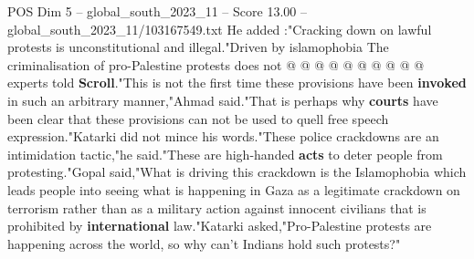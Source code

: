 \begin{textsample}{POS Dim 5 – global\_south\_2023\_11 – Score 13.00 – global\_south\_2023\_11/103167549.txt}
He added :"Cracking down on lawful protests is unconstitutional and illegal."Driven by islamophobia The criminalisation of pro-Palestine protests does not @ @ @ @ @ @ @ @ @ @ experts told \textbf{Scroll}."This is not the first time these provisions have been \textbf{invoked} in such an arbitrary manner,"Ahmad said."That is perhaps why \textbf{courts} have been clear that these provisions can not be used to quell free speech expression."Katarki did not mince his words."These police crackdowns are an intimidation tactic,"he said."These are high-handed \textbf{acts} to deter people from protesting."Gopal said,"What is driving this crackdown is the Islamophobia which leads people into seeing what is happening in Gaza as a legitimate crackdown on terrorism rather than as a military action against innocent civilians that is prohibited by \textbf{international} law."Katarki asked,"Pro-Palestine protests are happening across the world, so why can't Indians hold such protests?"

\end{textsample}
